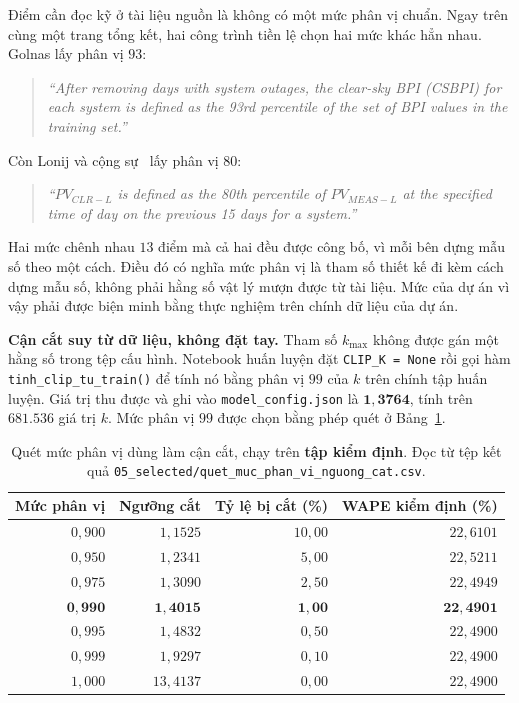 \documentclass[12pt, a4paper]{report}
\begin{document}
Điểm cần đọc kỹ ở tài liệu nguồn là không có một mức phân vị chuẩn. Ngay trên cùng
một trang tổng kết, hai công trình tiền lệ chọn hai mức khác hẳn nhau. Golnas lấy
phân vị $93$:

\begin{quote}\small
\textit{``After removing days with system outages, the clear-sky BPI (CSBPI) for each system is defined as the 93rd percentile of the set of BPI values in the training set.''}
\end{quote}

Còn Lonij và cộng sự~\cite{lonij2012tucson} lấy phân vị $80$:

\begin{quote}\small
\textit{``$PV_{CLR-L}$ is defined as the 80th percentile of $PV_{MEAS-L}$ at the specified time of day on the previous 15 days for a system.''}
\end{quote}


Hai mức chênh nhau $13$ điểm mà cả hai đều được công bố, vì mỗi bên dựng mẫu số theo một cách.
Điều đó có nghĩa mức phân vị là tham số thiết kế đi kèm cách dựng mẫu số, không phải
hằng số vật lý mượn được từ tài liệu. Mức của dự án vì vậy phải được biện minh bằng thực
nghiệm trên chính dữ liệu của dự án.

\textbf{Cận cắt suy từ dữ liệu, không đặt tay.} Tham số $k_{\max}$ không được gán một hằng số
trong tệp cấu hình. Notebook huấn luyện đặt \texttt{CLIP\_K = None} rồi gọi hàm
\texttt{tinh\_clip\_tu\_train()} để tính nó bằng phân vị $99$ của $k$ trên chính tập huấn luyện.
Giá trị thu được và ghi vào \texttt{model\_config.json} là $\mathbf{1{,}3764}$, tính trên
$681.536$ giá trị $k$. Mức phân vị $99$ được chọn bằng phép quét ở
Bảng~\ref{tab:quet_phan_vi}.

\begin{table}[htbp]
\centering
\caption{Quét mức phân vị dùng làm cận cắt, chạy trên \textbf{tập kiểm định}. Đọc từ tệp kết
quả \texttt{05\_selected/quet\_muc\_phan\_vi\_nguong\_cat.csv}.}
\label{tab:quet_phan_vi}
\small
\begin{tabular}{r r r r}
\toprule
\textbf{Mức phân vị} & \textbf{Ngưỡng cắt} & \textbf{Tỷ lệ bị cắt (\%)} & \textbf{WAPE kiểm định (\%)} \\
\midrule
$0{,}900$ & $1{,}1525$ & $10{,}00$ & $22{,}6101$ \\
$0{,}950$ & $1{,}2341$ & $5{,}00$  & $22{,}5211$ \\
$0{,}975$ & $1{,}3090$ & $2{,}50$  & $22{,}4949$ \\
$\mathbf{0{,}990}$ & $\mathbf{1{,}4015}$ & $\mathbf{1{,}00}$ & $\mathbf{22{,}4901}$ \\
$0{,}995$ & $1{,}4832$ & $0{,}50$  & $22{,}4900$ \\
$0{,}999$ & $1{,}9297$ & $0{,}10$  & $22{,}4900$ \\
$1{,}000$ & $13{,}4137$ & $0{,}00$ & $22{,}4900$ \\
\bottomrule
\end{tabular}
\end{table}
\end{document}
